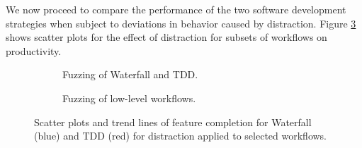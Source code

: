 \documentclass{llncs}
\begin{document}
We now proceed to compare the performance of the two software development strategies when subject to deviations in
behavior caused by distraction. Figure \ref{fig:fuzzing-features} shows scatter plots for the effect of distraction for
subsets of workflows on productivity.%
\begin{figure}[t]
  \centering
  \hfill
  \begin{subfigure}[t]{2.3in}%
    \caption{Fuzzing of Waterfall and TDD.}
    \label{fig:fuzzing-features:WT}
  \end{subfigure}
  \hfill
  \begin{subfigure}[t]{2.3in}
    \caption{Fuzzing of low-level workflows.}  
  \label{fig:fuzzing-features:CTIDR}
  \end{subfigure}
  \hfill

  \caption{Scatter plots and trend lines of feature completion for Waterfall (blue) and TDD (red) for distraction
    applied to selected workflows.}
  \label{fig:fuzzing-features}
\end{figure}
\end{document}
